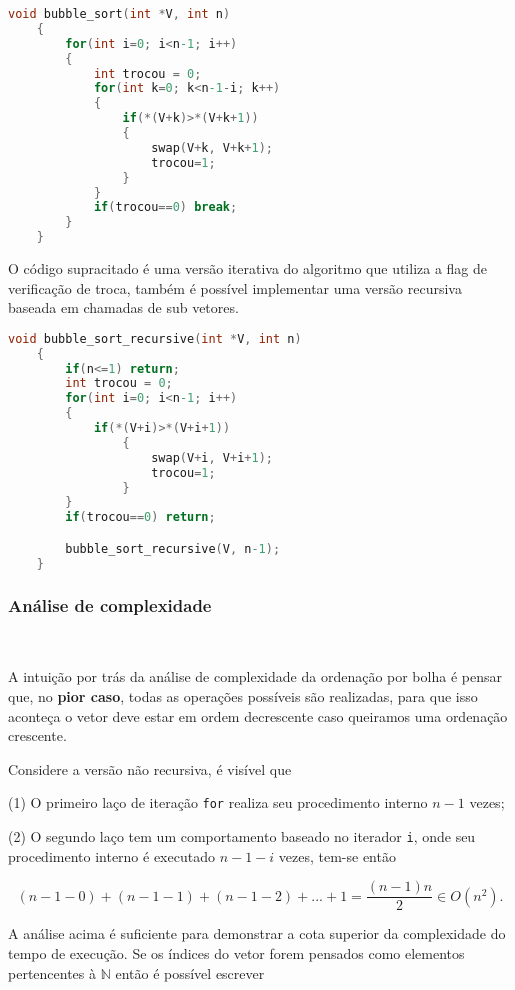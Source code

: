 \begin{lstlisting}[language=C, frame=single]
    void bubble_sort(int *V, int n)
    {
        for(int i=0; i<n-1; i++)
        {
            int trocou = 0;
            for(int k=0; k<n-1-i; k++)
            {
                if(*(V+k)>*(V+k+1))
                {
                    swap(V+k, V+k+1);
                    trocou=1;
                }
            }
            if(trocou==0) break;
        }
    }
\end{lstlisting}

O código supracitado é uma versão iterativa do algoritmo que utiliza a flag de verificação de troca, também é possível implementar uma versão recursiva baseada em chamadas de sub vetores.

\begin{lstlisting}[language=C, frame=single]
    void bubble_sort_recursive(int *V, int n)
    {
        if(n<=1) return;
        int trocou = 0;
        for(int i=0; i<n-1; i++)
        {
            if(*(V+i)>*(V+i+1))
                {
                    swap(V+i, V+i+1);
                    trocou=1;
                }
        }
        if(trocou==0) return;

        bubble_sort_recursive(V, n-1);
    }
\end{lstlisting}

\subsubsection{Análise de complexidade}
\

A intuição por trás da análise de complexidade da ordenação por bolha é pensar que, no \textbf{pior caso}, todas as operações possíveis são realizadas, para que isso aconteça o vetor deve estar em ordem decrescente caso queiramos uma ordenação crescente.

Considere a versão não recursiva, é visível que 

(1) O primeiro laço de iteração \texttt{for} realiza seu procedimento interno $n-1$ vezes;

(2) O segundo laço tem um comportamento baseado no iterador \texttt{i}, onde seu procedimento interno é executado $n-1-i$ vezes, tem-se então

\[(n-1-0)+(n-1-1)+(n-1-2)+...+1 = \frac{(n-1)n}{2}\in O(n^2).\]

A análise acima é suficiente para demonstrar a cota superior da complexidade do tempo de execução. Se os índices do vetor forem pensados como elementos pertencentes à $\mathbb{N}$ então é possível escrever 

